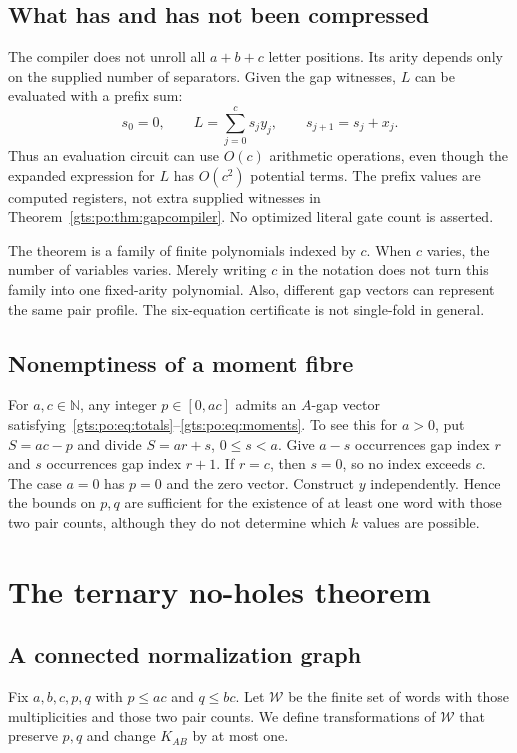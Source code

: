 \documentclass[11pt,letterpaper]{article}
\theoremstyle{definition}
\theoremstyle{remark}
\newcommand{\N}{\mathbb N}
\begin{document}
\subsection{What has and has not been compressed}
The compiler does not unroll all $a+b+c$ letter positions. Its arity depends only on the supplied number of separators. Given the gap witnesses, $L$ can be evaluated with a prefix sum:
\[
 s_0=0,\qquad L=\sum_{j=0}^c s_jy_j,
 \qquad s_{j+1}=s_j+x_j.
\]
Thus an evaluation circuit can use $O(c)$ arithmetic operations, even though the expanded expression for $L$ has $O(c^2)$ potential terms. The prefix values are computed registers, not extra supplied witnesses in Theorem~\ref{gts:po:thm:gapcompiler}. No optimized literal gate count is asserted.

The theorem is a family of finite polynomials indexed by $c$. When $c$ varies, the number of variables varies. Merely writing $c$ in the notation does not turn this family into one fixed-arity polynomial. Also, different gap vectors can represent the same pair profile. The six-equation certificate is not single-fold in general.

\subsection{Nonemptiness of a moment fibre}
For $a,c\in\N$, any integer $p\in[0,ac]$ admits an $A$-gap vector satisfying~\eqref{gts:po:eq:totals}--\eqref{gts:po:eq:moments}. To see this for $a>0$, put $S=ac-p$ and divide $S=ar+s$, $0\le s<a$. Give $a-s$ occurrences gap index $r$ and $s$ occurrences gap index $r+1$. If $r=c$, then $s=0$, so no index exceeds $c$. The case $a=0$ has $p=0$ and the zero vector. Construct $y$ independently. Hence the bounds on $p,q$ are sufficient for the existence of at least one word with those two pair counts, although they do not determine which $k$ values are possible.

\section{The ternary no-holes theorem}
\subsection{A connected normalization graph}
Fix $a,b,c,p,q$ with $p\le ac$ and $q\le bc$. Let $\mathcal W$ be the finite set of words with those multiplicities and those two pair counts. We define transformations of $\mathcal W$ that preserve $p,q$ and change $K_{AB}$ by at most one.
\end{document}
